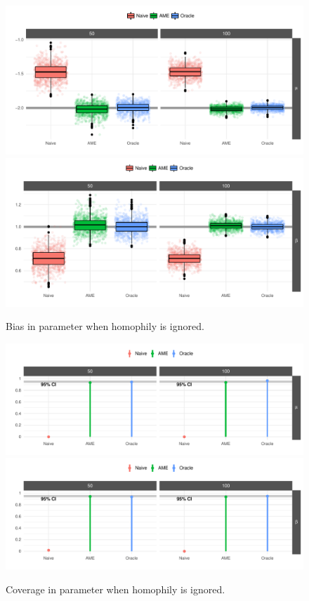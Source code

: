 \begin{figure}
	\centering
	\caption{Bias in parameter when homophily is ignored.}
	\label{fig:ameBias}
	\includegraphics[width=1\textwidth]{ameSimBias_mu.pdf} \\
	\includegraphics[width=1\textwidth]{ameSimBias_beta.pdf}
\end{figure}

\begin{figure}
	\centering
	\caption{Coverage in parameter when homophily is ignored.}
	\label{fig:ameCalib}
	\includegraphics[width=1\textwidth]{ameSimCover_mu.pdf} \\
	\includegraphics[width=1\textwidth]{ameSimCover_beta.pdf}
\end{figure}

